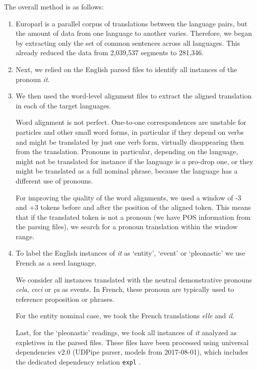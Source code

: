 \documentclass[10pt, a4paper]{article}
\begin{document}
The overall method is as follows:

\begin{enumerate}\setlength\itemsep{1em}

\item Europarl is a parallel corpus of translations
between the language pairs, but the amount of data from one language to another
varies. Therefore, we began by extracting only the set of common sentences
across all languages. This already reduced the data from 2,039,537 segments to
281,346. 

\item  Next, we relied on the English parsed files to
identify all instances of the pronoun \textit{it}.

\item We then used the word-level alignment files to
extract the aligned translation in each of the target languages.

Word alignment is not perfect. One-to-one correspondences are unstable for
particles and other small word forms, in particular if they depend on verbs and 
might be translated by just one verb form, virtually disappearing then from the
translation. Pronouns in particular, depending on the language, might not be
translated for instance if the language is a pro-drop one, or they might be
translated as a full nominal phrase, because the language has a different use of
pronouns.

For improving the quality of the word alignments, we used a window of -3 and
+3 tokens before and after the position of the aligned token. This means that if
the translated token is not a pronoun (we have POS information from the parsing
files), we search for a pronoun translation within the window range.

\item To label the English instances of \textit{it} as `entity', `event' or 
`pleonastic' we use French as a seed language.

We consider all instances 
translated with the neutral demonstrative pronouns \textit{cela}, \textit{ceci} or 
\textit{ça} as events. In French, these pronoun are typically used to reference 
proposition or phrases. 

For the entity nominal case, we took the French translations \textit{elle} and 
\textit{il}.

Last, for the `pleonastic' readings, we took all instances of \textit{it} analyzed 
as expletives in the parsed files. These files have been processed using universal 
dependencies v2.0 (UDPipe parser, models from 2017-08-01), which includes the 
dedicated dependency relation \texttt{expl} \cite{bouma-etal-2018-expletives}.


\end{enumerate}
\end{document}
